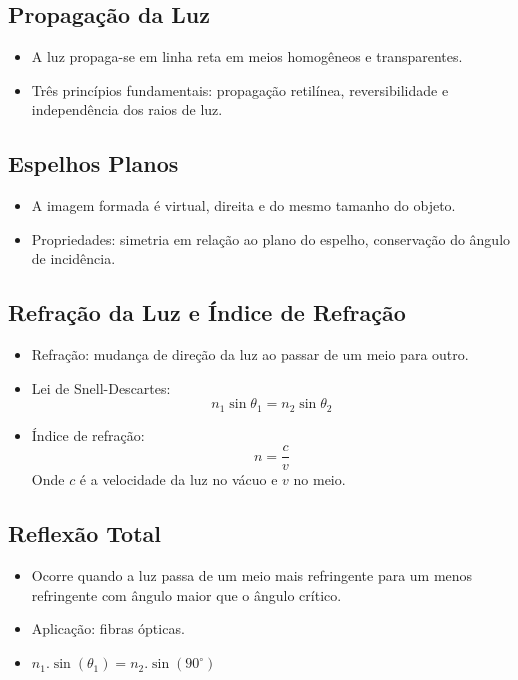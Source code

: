 \documentclass[a4paper,12pt]{article}
\begin{document}
\begin{multicols}{2}
\subsection{Propagação da Luz}
\begin{itemize}
    \item A luz propaga-se em linha reta em meios homogêneos e transparentes.
    \item Três princípios fundamentais: propagação retilínea, reversibilidade e independência dos raios de luz.
\end{itemize}

\subsection{Espelhos Planos}
\begin{itemize}
    \item A imagem formada é virtual, direita e do mesmo tamanho do objeto.
    \item Propriedades: simetria em relação ao plano do espelho, conservação do ângulo de incidência.
\end{itemize}

\subsection{Refração da Luz e Índice de Refração}
\begin{itemize}
    \item Refração: mudança de direção da luz ao passar de um meio para outro.
    \item Lei de Snell-Descartes:
    \[
        n_1 \sin \theta_1 = n_2 \sin \theta_2
    \]
    \item Índice de refração:
    \[
        n = \frac{c}{v}
    \]
    Onde $c$ é a velocidade da luz no vácuo e $v$ no meio.
\end{itemize}

\subsection{Reflexão Total}
\begin{itemize}
    \item Ocorre quando a luz passa de um meio mais refringente para um menos refringente com ângulo maior que o ângulo crítico.
    \item Aplicação: fibras ópticas.
    \item $n_{1}.\sin(\theta_{1}) = n_{2}.\sin(90^{\circ})$
\end{itemize}


\end{multicols}
\end{document}
